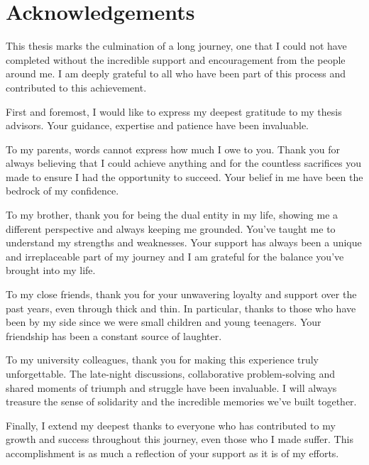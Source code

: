 \chapter*{Acknowledgements}

\setlength{\parindent}{0pt}
\setlength{\parskip}{4pt}

This thesis marks the culmination of a long journey, one that I could not have completed without the incredible support and encouragement from the people around me. I am deeply grateful to all who have been part of this process and contributed to this achievement.

First and foremost, I would like to express my deepest gratitude to my thesis advisors. Your guidance, expertise and patience have been invaluable.

To my parents, words cannot express how much I owe to you. Thank you for always believing that I could achieve anything and for the countless sacrifices you made to ensure I had the opportunity to succeed. Your belief in me have been the bedrock of my confidence.

To my brother, thank you for being the dual entity in my life, showing me a different perspective and always keeping me grounded. You've taught me to understand my strengths and weaknesses. Your support has always been a unique and irreplaceable part of my journey and I am grateful for the balance you've brought into my life.

To my close friends, thank you for your unwavering loyalty and support over the past years, even through thick and thin. In particular, thanks to those who have been by my side since we were small children and young teenagers. Your friendship has been a constant source of laughter.

To my university colleagues, thank you for making this experience truly unforgettable. The late-night discussions, collaborative problem-solving and shared moments of triumph and struggle have been invaluable. I will always treasure the sense of solidarity and the incredible memories we've built together.

Finally, I extend my deepest thanks to everyone who has contributed to my growth and success throughout this journey, even those who I made suffer. This accomplishment is as much a reflection of your support as it is of my efforts.
